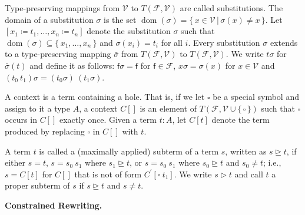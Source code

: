 Type-preserving mappings from $\mathcal{V}$ to $T(\mathcal{F},\mathcal{V})$ are called substitutions. The domain of a substitution $\sigma$ is the set $\operatorname{dom}(\sigma)=\{\,x\in\mathcal{V}\,|\,\sigma(x)\neq x\,\}$. Let $[{x_{1}}\coloneq{t_{1}},\ldots,{x_{n}}\coloneq{t_{n}}]$ denote the substitution $\sigma$ such that $\operatorname{dom}(\sigma)\subseteq\{\,{x}_{1},\ldots,{x}_{n}\,\}$ and $\sigma(x_{i})=t_{i}$ for all $i$. Every substitution $\sigma$ extends to a type-preserving mapping $\bar{\sigma}$ from $T(\mathcal{F},\mathcal{V})$ to $T(\mathcal{F},\mathcal{V})$. We write $t\sigma$ for $\bar{\sigma}(t)$ and define it as follows: $\mathsf{f}\sigma=\mathsf{f}$ for $\mathsf{f}\in\mathcal{F}$, $x\sigma=\sigma(x)$ for $x\in\mathcal{V}$ and $({t_{0}}\ {t_{1}})\sigma={(t_{0}\sigma)}\ {(t_{1}\sigma)}$.\par
 
 
 
A context is a term containing a hole. That is, if we let $\square$ be a special symbol and assign to it a type $A$, a context ${C}[]$ is an element of $T(\mathcal{F},\mathcal{V}\cup\{\,\square\,\})$ such that $\square$ occurs in ${C}[]$ exactly once. Given a term $t:A$, let ${C}[t]$ denote the term produced by replacing $\square$ in ${C}[]$ with $t$.\par
 
 
 
A term $t$ is called a (maximally applied) subterm of a term $s$, written as $s\trianglerighteq t$, if either $s=t$, $s={s_{0}}\ {s_{1}}$ where $s_{1}\trianglerighteq t$, or $s={s_{0}}\ {s_{1}}$ where $s_{0}\trianglerighteq t$ and $s_{0}\neq t$; i.e., $s={C}[t]$ for ${C}[]$ that is not of form ${C^{\prime}}[{\square}\ {t_{1}}]$. We write $s\vartriangleright t$ and call $t$ a proper subterm of $s$ if $s\trianglerighteq t$ and $s\neq t$.\par
 
 
 
 
\par\medskip\noindent\textbf{Constrained Rewriting.}\par
 
 
